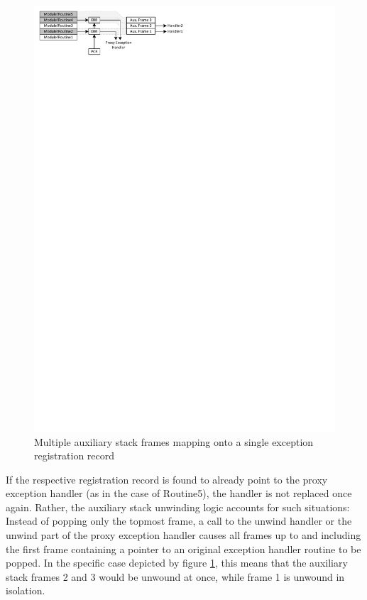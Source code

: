 \begin{figure}[htbp] 
\begin{centering} 
\includegraphics[scale=1.2, clip=true, viewport=0cm 26cm 11cm  30cm]{images/diagrams/ExceptionSimpleWithInstrMulti.pdf} 
\caption[Multiple auxiliary stack frames mapping onto a single registration record]{Multiple auxiliary stack frames mapping onto a single exception registration record} 
\label{ExceptionSimpleWithInstrMulti} 
\end{centering} 
\end{figure}

If the respective registration record is found to already point to the proxy exception handler (as 
in the case of Routine5), the handler
is not replaced once again. Rather, the auxiliary stack unwinding logic accounts for such
situations: Instead of popping only the topmost frame, a call to the unwind handler or 
the unwind part of the proxy exception handler causes all frames up to and including the first frame 
containing a pointer to an original exception handler routine to be popped. In the specific
case depicted by figure \ref{ExceptionSimpleWithInstrMulti}, this means that the
auxiliary stack frames 2 and 3 would be unwound at once, while frame 1 is unwound
in isolation.



